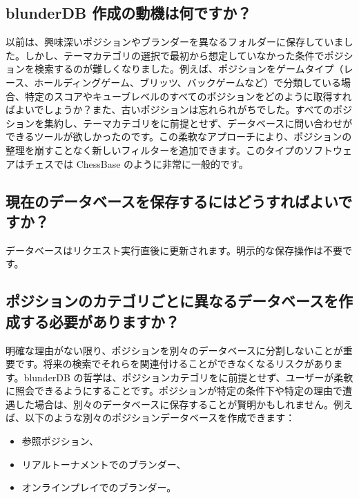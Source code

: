 \documentclass[letterpaper,10pt,dvipdfmx]{sphinxmanual}
\begin{document}
\subsection{blunderDB 作成の動機は何ですか？}
\label{\detokenize{faq:qu-est-ce-qui-a-motive-la-creation-de-blunderdb}}
\sphinxAtStartPar
以前は、興味深いポジションやブランダーを異なるフォルダーに保存していました。しかし、テーマカテゴリの選択で最初から想定していなかった条件でポジションを検索するのが難しくなりました。例えば、ポジションをゲームタイプ（レース、ホールディングゲーム、ブリッツ、バックゲームなど）で分類している場合、特定のスコアやキューブレベルのすべてのポジションをどのように取得すればよいでしょうか？また、古いポジションは忘れられがちでした。すべてのポジションを集約し、テーマカテゴリをに前提とせず、データベースに問い合わせができるツールが欲しかったのです。この柔軟なアプローチにより、ポジションの整理を崩すことなく新しいフィルターを追加できます。このタイプのソフトウェアはチェスでは ChessBase のように非常に一般的です。


\subsection{現在のデータベースを保存するにはどうすればよいですか？}
\label{\detokenize{faq:comment-sauvegarder-la-base-de-donnees-courante}}
\sphinxAtStartPar
データベースはリクエスト実行直後に更新されます。明示的な保存操作は不要です。


\subsection{ポジションのカテゴリごとに異なるデータベースを作成する必要がありますか？}
\label{\detokenize{faq:dois-je-creer-differentes-bases-de-donnees-pour-differentes-categories-de-positions}}
\sphinxAtStartPar
明確な理由がない限り、ポジションを別々のデータベースに分割しないことが重要です。将来の検索でそれらを関連付けることができなくなるリスクがあります。blunderDB の哲学は、ポジションカテゴリをに前提とせず、ユーザーが柔軟に照会できるようにすることです。ポジションが特定の条件下や特定の理由で遭遇した場合は、別々のデータベースに保存することが賢明かもしれません。例えば、以下のような別々のポジションデータベースを作成できます：
\begin{itemize}
\item {} 
\sphinxAtStartPar
参照ポジション、

\item {} 
\sphinxAtStartPar
リアルトーナメントでのブランダー、

\item {} 
\sphinxAtStartPar
オンラインプレイでのブランダー。

\end{itemize}
\end{document}
